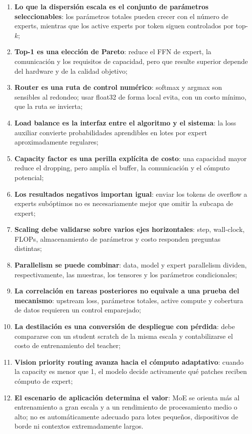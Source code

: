 \documentclass[a4paper]{article}
\begin{document}
\begin{enumerate}
  \item \textbf{Lo que la dispersión escala es el conjunto de parámetros seleccionables}: los parámetros totales pueden crecer con el número de experts, mientras que los active experts por token siguen controlados por top-$k$;
  \item \textbf{Top-1 es una elección de Pareto}: reduce el FFN de expert, la comunicación y los requisitos de capacidad, pero que resulte superior depende del hardware y de la calidad objetivo;
  \item \textbf{Router es una ruta de control numérico}: softmax y argmax son sensibles al redondeo; usar float32 de forma local evita, con un costo mínimo, que la ruta se invierta;
  \item \textbf{Load balance es la interfaz entre el algoritmo y el sistema}: la loss auxiliar convierte probabilidades aprendibles en lotes por expert aproximadamente regulares;
  \item \textbf{Capacity factor es una perilla explícita de costo}: una capacidad mayor reduce el dropping, pero amplía el buffer, la comunicación y el cómputo potencial;
  \item \textbf{Los resultados negativos importan igual}: enviar los tokens de overflow a experts subóptimos no es necesariamente mejor que omitir la subcapa de expert;
  \item \textbf{Scaling debe validarse sobre varios ejes horizontales}: step, wall-clock, FLOPs, almacenamiento de parámetros y costo responden preguntas distintas;
  \item \textbf{Parallelism se puede combinar}: data, model y expert parallelism dividen, respectivamente, las muestras, los tensores y los parámetros condicionales;
  \item \textbf{La correlación en tareas posteriores no equivale a una prueba del mecanismo}: upstream loss, parámetros totales, active compute y cobertura de datos requieren un control emparejado;
  \item \textbf{La destilación es una conversión de despliegue con pérdida}: debe compararse con un student scratch de la misma escala y contabilizarse el costo de entrenamiento del teacher;
  \item \textbf{Vision priority routing avanza hacia el cómputo adaptativo}: cuando la capacity es menor que 1, el modelo decide activamente qué patches reciben cómputo de expert;
  \item \textbf{El escenario de aplicación determina el valor}: MoE se orienta más al entrenamiento a gran escala y a un rendimiento de procesamiento medio o alto; no es automáticamente adecuado para lotes pequeños, dispositivos de borde ni contextos extremadamente largos.
\end{enumerate}
\end{document}
